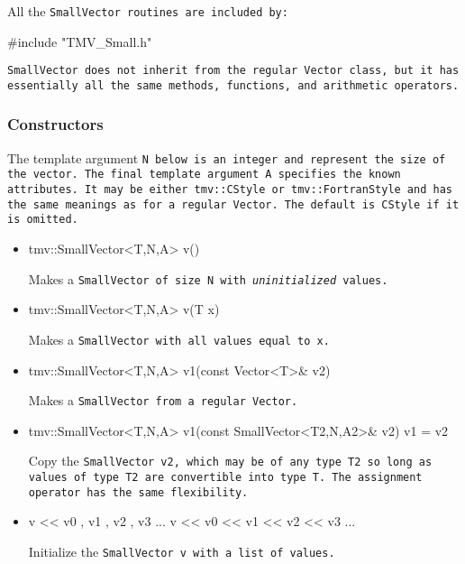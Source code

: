 All the \tt{SmallVector} routines are included by:
\begin{tmvcode}
#include "TMV_Small.h"
\end{tmvcode}
\tt{SmallVector} does not inherit from the regular \tt{Vector} class, but it has 
essentially all the same methods, functions, and arithmetic operators. 

\subsubsection{Constructors}
\label{SmallVector_Constructors}

The template argument \tt{N} below is an integer and
represent the size of the vector.
The final template argument 
 \tt{A} specifies the known attributes.  It may be either \tt{tmv::CStyle} or
\tt{tmv::FortranStyle} and has the same meanings as 
for a regular \tt{Vector}. The default is \tt{CStyle} if it is omitted.

\begin{itemize}
\item 
\begin{tmvcode}
tmv::SmallVector<T,N,A> v()
\end{tmvcode}
Makes a \tt{SmallVector} of size \tt{N}
with {\em uninitialized} values.

\item
\begin{tmvcode}
tmv::SmallVector<T,N,A> v(T x)
\end{tmvcode}
Makes a \tt{SmallVector} with all values equal to \tt{x}.

\item 
\begin{tmvcode}
tmv::SmallVector<T,N,A> v1(const Vector<T>& v2)
\end{tmvcode}
Makes a \tt{SmallVector} from a regular \tt{Vector}.

\item
\begin{tmvcode}
tmv::SmallVector<T,N,A> v1(const SmallVector<T2,N,A2>& v2)
v1 = v2
\end{tmvcode}
Copy the \tt{SmallVector v2}, which may be of any type \tt{T2} so long
as values of type \tt{T2} are convertible into type \tt{T}.
The assignment operator has the same flexibility.

\item
\begin{tmvcode}
v << v0 , v1 , v2 , v3 ...
v << v0 << v1 << v2 << v3 ...
\end{tmvcode}
Initialize the \tt{SmallVector v} with a list of values.

\end{itemize}


